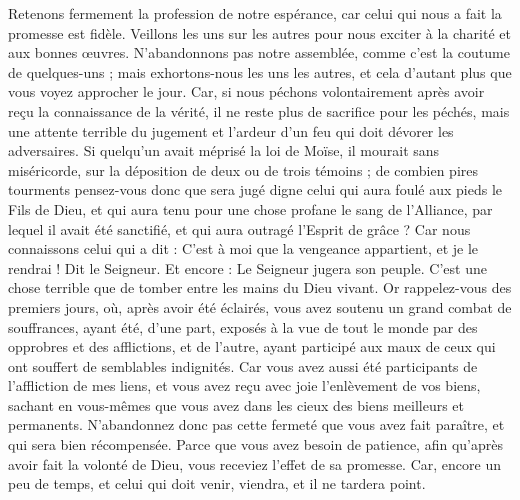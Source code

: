 \begin{multicols}{2}
Retenons fermement la profession de notre espérance, car celui qui nous a fait la promesse est fidèle.
Veillons les uns sur les autres pour nous exciter à la charité et aux bonnes œuvres.
N'abandonnons pas notre assemblée, comme c'est la coutume de quelques-uns ; mais exhortons-nous les uns les autres, et cela d'autant plus que vous voyez approcher le jour.
Car, si nous péchons volontairement après avoir reçu la connaissance de la vérité, il ne reste plus de sacrifice pour les péchés,
mais une attente terrible du jugement et l'ardeur d'un feu qui doit dévorer les adversaires.
Si quelqu'un avait méprisé la loi de Moïse, il mourait sans miséricorde, sur la déposition de deux ou de trois témoins ;
de combien pires tourments pensez-vous donc que sera jugé digne celui qui aura foulé aux pieds le Fils de Dieu, et qui aura tenu pour une chose profane le sang de l'Alliance, par lequel il avait été sanctifié, et qui aura outragé l'Esprit de grâce ?
Car nous connaissons celui qui a dit : C'est à moi que la vengeance appartient, et je le rendrai ! Dit le Seigneur. Et encore : Le Seigneur jugera son peuple.
C'est une chose terrible que de tomber entre les mains du Dieu vivant.
Or rappelez-vous des premiers jours, où, après avoir été éclairés, vous avez soutenu un grand combat de souffrances,
ayant été, d'une part, exposés à la vue de tout le monde par des opprobres et des afflictions, et de l'autre, ayant participé aux maux de ceux qui ont souffert de semblables indignités.
Car vous avez aussi été participants de l'affliction de mes liens, et vous avez reçu avec joie l'enlèvement de vos biens, sachant en vous-mêmes que vous avez dans les cieux des biens meilleurs et permanents.
N'abandonnez donc pas cette fermeté que vous avez fait paraître, et qui sera bien récompensée.
Parce que vous avez besoin de patience, afin qu'après avoir fait la volonté de Dieu, vous receviez l'effet de sa promesse.
Car, encore un peu de temps, et celui qui doit venir, viendra, et il ne tardera point.

\end{multicols}

